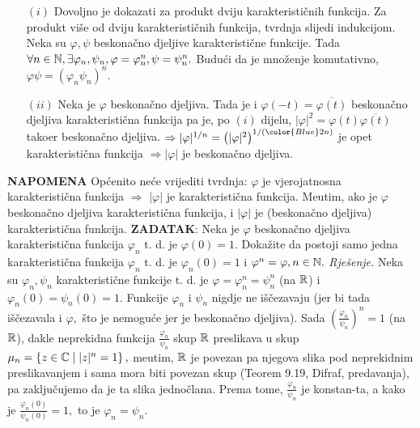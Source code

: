 \documentclass{article}
\begin{document}
\begin{enumerate}
    \item[\((i)\)] Dovoljno je dokazati za produkt dviju karakterističnih funkcija. Za produkt više od dviju karakterističnih funkcija, tvrdnja slijedi indukcijom. Neka su \(\varphi,\psi\) beskonačno djeljive karakteristične funkcije. Tada \(\forall n\in\Bbb N,\exists\varphi_n,\psi_n,\varphi=\varphi_n^n,\psi=\psi_n^n.\) Budući da je množenje komutativno, \(\varphi\psi=\left(\varphi_n\psi_n\right)^n.\)
    \item[\((ii)\)] Neka je \(\varphi\) beskonačno djeljiva. Tada je i \(\varphi(-t)=\overline{\varphi(t)}\) beskonačno djeljiva karakteristična funkcija pa je, po \((i)\) dijelu, \(|\varphi|^2=\varphi(t)\overline{\varphi(t)}\) tako\dj{}er beskonačno djeljiva. \(\Rightarrow|\varphi|^{1/n}=\left(|\varphi|^2\right)^{1/({\color{Blue}2n})}\) je opet karakteristična funkcija \(\Rightarrow|\varphi|\) je beskonačno djeljiva. 
\end{enumerate}
\textbf{NAPOMENA}\newline
Općenito neće vrijediti tvrdnja: \(\varphi\) je vjerojatnosna karakteristična funkcija \(\Rightarrow\) \(|\varphi|\) je karakteristična funkcija. Me\dj{}utim, ako je \(\varphi\) beskonačno djeljiva karakteristična funkcija, i \(|\varphi|\) je (beskonačno djeljiva) karakteristična funkcija.
\newline\newline
\textbf{ZADATAK}:\newline 
Neka je \(\varphi\) beskonačno djeljiva karakteristična funkcija \(\varphi_n\) t. d. je \(\varphi(0)=1.\) Dokažite da postoji samo jedna karakteristična funkcija \(\varphi_n\) t. d. je \(\varphi_n(0)=1\) i \(\varphi^n=\varphi,n\in\Bbb N.\)\newline\newline
\textit{Rješenje.}\newline
Neka su \(\varphi_n,\psi_n\) karakteristične funkcije t. d. je \(\varphi=\varphi_n^n=\psi_n^n\) (na \(\Bbb R\)) i \(\varphi_n(0)=\psi_n(0)=1.\) Funkcije \(\varphi_n\) i \(\psi_n\) nigdje ne iščezavaju (jer bi tada iščezavala i \(\varphi,\) što je nemoguće jer je beskonačno djeljiva).  Sada \(\left(\frac{\varphi_n}{\psi_n}\right)^n=1\) (na \(\Bbb R\)), dakle neprekidna funkcija \(\frac{\varphi_n}{\psi_n}\) skup \(\Bbb R\) preslikava u skup \(\mu_n=\left\{z\in\Bbb C\mid |z|^n=1\right\},\) me\dj{}utim, \(\Bbb R\) je povezan pa njegova slika pod neprekidnim preslikavanjem i sama mora biti povezan skup (Teorem 9.19, Difraf, predavanja), pa zaključujemo da je ta slika jednočlana. Prema tome, \(\frac{\varphi_n}{\psi_n}\) je konstan-\newline ta, a kako je \(\frac{\varphi_n(0)}{\psi_n(0)}=1,\) to je \(\varphi_n=\psi_n.\)\newline\newline
\end{document}

